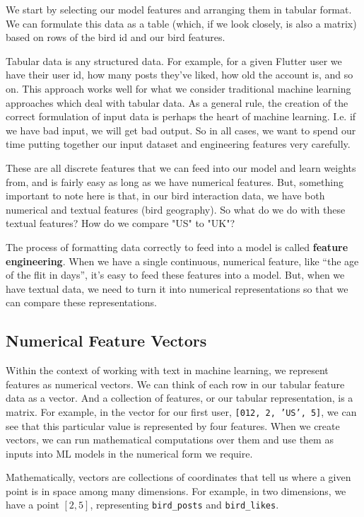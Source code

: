 \documentclass[11pt, table]{diazessay} %
\begin{document}
\begin{sloppypar}
We start by selecting our model features and arranging them in tabular format.  We can formulate this data as a table (which, if we look closely, is also a matrix) based on rows of the bird id and our bird features.

Tabular data is any structured data. For example, for a given Flutter user we have their user id, how many posts they've liked, how old the account is, and so on. This approach works well for what we consider traditional machine learning approaches which deal with tabular data.  As a general rule, the creation of the correct formulation of input data is perhaps the heart of machine learning. I.e. if we have bad input, we will get bad output. So in all cases, we want to spend our time putting together our input dataset and engineering features very carefully.

These are all discrete features that we can feed into our model and learn weights from, and is fairly easy as long as we have numerical features.  But, something important to note here is that, in our bird interaction data, we have both numerical and textual features (bird geography). So what do we do with these textual features? How do we compare "US" to "UK"?

The process of formatting data correctly to feed into a model is called \textbf{feature engineering}. When we have a single continuous, numerical feature, like “the age of the flit in days”, it’s easy to feed these features into a model. But, when we have textual data, we need to turn it into numerical representations so that we can compare these representations.  

\subsection{Numerical Feature Vectors}
Within the context of working with text in machine learning, we represent features as numerical vectors. We can think of each row in our tabular feature data as a vector. And a collection of features, or our tabular representation, is a matrix. For example, in the vector for our first user, \texttt{[012, 2, 'US', 5]}, we can see that this particular value is represented by four features. When we create vectors, we can run mathematical computations over them and use them as inputs into ML models in the numerical form we require.

Mathematically, vectors are collections of coordinates that tell us where a given point is in space among many dimensions. For example, in two dimensions, we have a point $[2,5]$, representing \texttt{bird_posts} and \texttt{bird_likes}.



\end{sloppypar}
\end{document}
